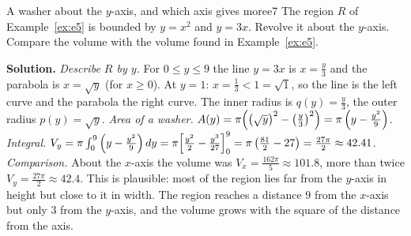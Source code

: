 \documentclass[11pt]{article}
\begin{document}
\begin{exmp}{A washer about the $y$-axis, and which axis gives more}{e7}
The region $R$ of Example~\ref{ex:e5} is bounded by $y=x^2$ and $y=3x$. Revolve it about the $y$-axis. Compare the volume with the volume found in Example~\ref{ex:e5}.

\textbf{Solution.} \emph{Describe $R$ by $y$.} For $0\le y\le9$ the line $y=3x$ is $x=\frac y3$ and the parabola is $x=\sqrt y$ (for $x\ge0$). At $y=1$: $x=\frac13<1=\sqrt1$, so the line is the left curve and the parabola the right curve. The inner radius is $q(y)=\frac y3$, the outer radius $p(y)=\sqrt y$.
\emph{Area of a washer.} $A(y)=\pi\Bigl(\bigl(\sqrt y\bigr)^2-\left(\frac y3\right)^2\Bigr)=\pi\left(y-\frac{y^2}9\right)$.
\emph{Integral.} $V_y=\pi\int_0^9\left(y-\frac{y^2}9\right)dy=\pi\Bigl[\frac{y^2}2-\frac{y^3}{27}\Bigr]_0^9=\pi\left(\frac{81}2-27\right)=\frac{27\pi}2\approx42.41$.
\emph{Comparison.} About the $x$-axis the volume was $V_x=\frac{162\pi}5\approx101.8$, more than twice $V_y=\frac{27\pi}2\approx42.4$. This is plausible: most of the region lies far from the $y$-axis in height but close to it in width. The region reaches a distance $9$ from the $x$-axis but only $3$ from the $y$-axis, and the volume grows with the square of the distance from the axis.
\begin{center}
\end{center}
\end{exmp}
\end{document}
